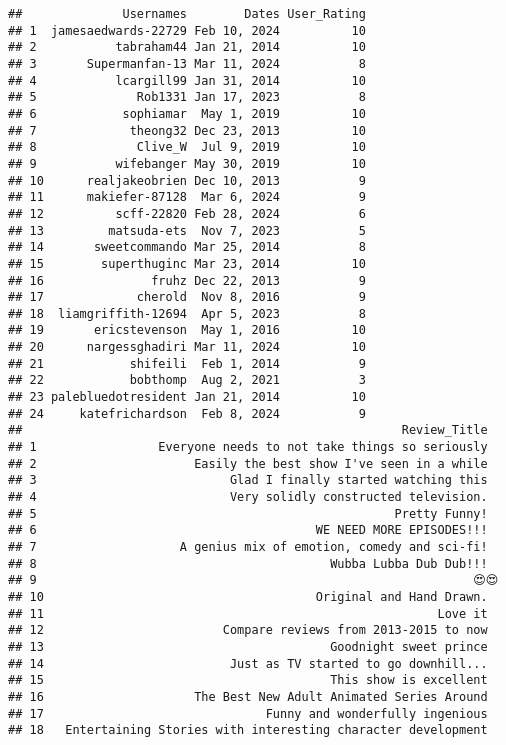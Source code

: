 \documentclass[
]{article}
\begin{document}
\begin{verbatim}
##              Usernames        Dates User_Rating
## 1  jamesaedwards-22729 Feb 10, 2024          10
## 2           tabraham44 Jan 21, 2014          10
## 3       Supermanfan-13 Mar 11, 2024           8
## 4           lcargill99 Jan 31, 2014          10
## 5              Rob1331 Jan 17, 2023           8
## 6            sophiamar  May 1, 2019          10
## 7             theong32 Dec 23, 2013          10
## 8              Clive_W  Jul 9, 2019          10
## 9           wifebanger May 30, 2019          10
## 10      realjakeobrien Dec 10, 2013           9
## 11      makiefer-87128  Mar 6, 2024           9
## 12          scff-22820 Feb 28, 2024           6
## 13         matsuda-ets  Nov 7, 2023           5
## 14       sweetcommando Mar 25, 2014           8
## 15        superthuginc Mar 23, 2014          10
## 16               fruhz Dec 22, 2013           9
## 17             cherold  Nov 8, 2016           9
## 18  liamgriffith-12694  Apr 5, 2023           8
## 19       ericstevenson  May 1, 2016          10
## 20      nargessghadiri Mar 11, 2024          10
## 21            shifeili  Feb 1, 2014           9
## 22            bobthomp  Aug 2, 2021           3
## 23 palebluedotresident Jan 21, 2014          10
## 24     katefrichardson  Feb 8, 2024           9
##                                                     Review_Title
## 1                 Everyone needs to not take things so seriously
## 2                      Easily the best show I've seen in a while
## 3                           Glad I finally started watching this
## 4                           Very solidly constructed television.
## 5                                                  Pretty Funny!
## 6                                       WE NEED MORE EPISODES!!!
## 7                    A genius mix of emotion, comedy and sci-fi!
## 8                                         Wubba Lubba Dub Dub!!!
## 9                                                             😍😍
## 10                                      Original and Hand Drawn.
## 11                                                       Love it
## 12                         Compare reviews from 2013-2015 to now
## 13                                        Goodnight sweet prince
## 14                          Just as TV started to go downhill...
## 15                                        This show is excellent
## 16                     The Best New Adult Animated Series Around
## 17                               Funny and wonderfully ingenious
## 18   Entertaining Stories with interesting character development

\end{verbatim}
\end{document}
